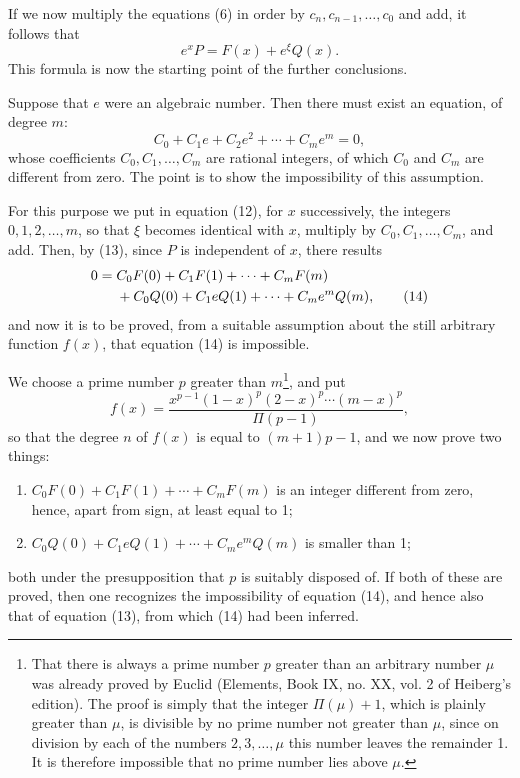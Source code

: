 \documentclass[11pt]{article}
\begin{document}
If we now multiply the equations (6) in order by $c_n,c_{n-1},\ldots,c_0$ and add, it follows that
\begin{equation}\tag{12}
e^xP=F(x)+e^\xi Q(x).
\end{equation}
This formula is now the starting point of the further conclusions.

Suppose that $e$ were an algebraic number. Then there must exist an equation, of degree $m$:
\begin{equation}\tag{13}
C_0+C_1e+C_2e^2+\cdots+C_me^m=0,
\end{equation}
whose coefficients $C_0,C_1,\ldots,C_m$ are rational integers, of which $C_0$ and $C_m$ are different from zero. The point is to show the impossibility of this assumption.

For this purpose we put in equation (12), for $x$ successively, the integers $0,1,2,\ldots,m$, so that $\xi$ becomes identical with $x$, multiply by $C_0,C_1,\ldots,C_m$, and add. Then, by (13), since $P$ is independent of $x$, there results
\begin{align}
0={}&C_0F(0)+C_1F(1)+\cdots+C_mF(m)\notag\\
&+C_0Q(0)+C_1eQ(1)+\cdots+C_me^mQ(m),\tag{14}
\end{align}
and now it is to be proved, from a suitable assumption about the still arbitrary function $f(x)$, that equation (14) is impossible.

We choose a prime number $p$ greater than $m$\footnote{That there is always a prime number $p$ greater than an arbitrary number $\mu$ was already proved by Euclid (Elements, Book IX, no. XX, vol. 2 of Heiberg's edition). The proof is simply that the integer $\Pi(\mu)+1$, which is plainly greater than $\mu$, is divisible by no prime number not greater than $\mu$, since on division by each of the numbers $2,3,\ldots,\mu$ this number leaves the remainder 1. It is therefore impossible that no prime number lies above $\mu$.}, and put
\begin{equation}\tag{15}
f(x)=\frac{x^{p-1}(1-x)^p(2-x)^p\cdots(m-x)^p}{\Pi(p-1)},
\end{equation}
so that the degree $n$ of $f(x)$ is equal to $(m+1)p-1$, and we now prove two things:
\begin{enumerate}[label=\arabic*)]
\item $C_0F(0)+C_1F(1)+\cdots+C_mF(m)$ is an integer different from zero, hence, apart from sign, at least equal to 1;
\item $C_0Q(0)+C_1eQ(1)+\cdots+C_me^mQ(m)$ is smaller than 1;
\end{enumerate}
both under the presupposition that $p$ is suitably disposed of. If both of these are proved, then one recognizes the impossibility of equation (14), and hence also that of equation (13), from which (14) had been inferred.
\end{document}
